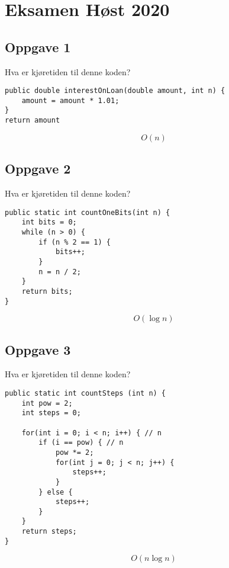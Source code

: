\documentclass{article}
\begin{document}
\section{Eksamen Høst 2020}
    \subsection{Oppgave 1}
    Hva er kjøretiden til denne koden?

    \begin{lstlisting}
public double interestOnLoan(double amount, int n) {
    amount = amount * 1.01; 
}
return amount
    \end{lstlisting}

    \begin{ans}
        \[ O(n) \]
    \end{ans}

    \subsection{Oppgave 2}
    Hva er kjøretiden til denne koden?

    \begin{lstlisting}
public static int countOneBits(int n) {
    int bits = 0;
    while (n > 0) {
        if (n % 2 == 1) {
            bits++;
        }
        n = n / 2;
    }
    return bits;
}
    \end{lstlisting}

    \begin{ans}
        \[ O\left( \log n  \right) \]
    \end{ans}

    \subsection{Oppgave 3}
    Hva er kjøretiden til denne koden?
        
    \begin{lstlisting}
public static int countSteps (int n) {
    int pow = 2;
    int steps = 0;

    for(int i = 0; i < n; i++) { // n
        if (i == pow) { // n
            pow *= 2;
            for(int j = 0; j < n; j++) {
                steps++;
            }
        } else {
            steps++;
        }
    }
    return steps;
} 
    \end{lstlisting}

    \begin{ans}
        \[ O\left( n \log n \right) \]
    \end{ans}
\end{document}
